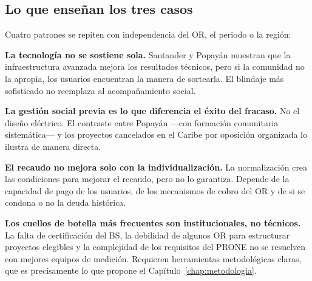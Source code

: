 \subsection{Lo que enseñan los tres casos}
\label{subsec:sintesis_casos}

Cuatro patrones se repiten con independencia del OR, el periodo o la región:

\textbf{La tecnología no se sostiene sola.} Santander y Popayán muestran que la infraestructura avanzada mejora los resultados técnicos, pero si la comunidad no la apropia, los usuarios encuentran la manera de sortearla. El blindaje más sofisticado no reemplaza al acompañamiento social.

\textbf{La gestión social previa es lo que diferencia el éxito del fracaso.} No el diseño eléctrico. El contraste entre Popayán —con formación comunitaria sistemática— y los proyectos cancelados en el Caribe por oposición organizada lo ilustra de manera directa.

\textbf{El recaudo no mejora solo con la individualización.} La normalización crea las condiciones para mejorar el recaudo, pero no lo garantiza. Depende de la capacidad de pago de los usuarios, de los mecanismos de cobro del OR y de si se condona o no la deuda histórica.

\textbf{Los cuellos de botella más frecuentes son institucionales, no técnicos.} La falta de certificación del BS, la debilidad de algunos OR para estructurar proyectos elegibles y la complejidad de los requisitos del PRONE no se resuelven con mejores equipos de medición. Requieren herramientas metodológicas claras, que es precisamente lo que propone el Capítulo~\ref{chap:metodologia}.